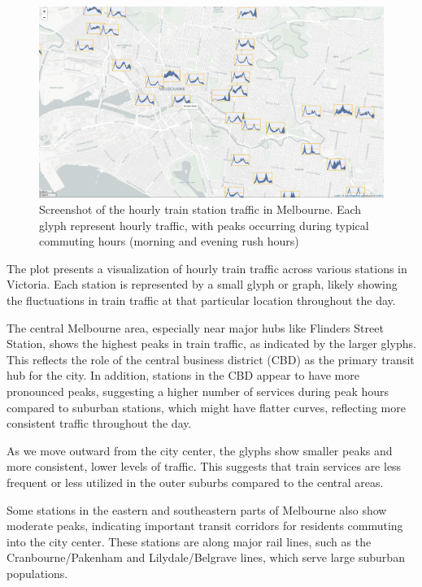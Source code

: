 \begin{figure}
\includegraphics[width=26.31in]{figures/leaflet} \caption{Screenshot of the hourly train station traffic in Melbourne. Each glyph represent hourly traffic, with peaks occurring during typical commuting hours (morning and evening rush hours)}\label{fig:unnamed-chunk-20}
\end{figure}

The plot presents a visualization of hourly train traffic across various stations in Victoria. Each station is represented by a small glyph or graph, likely showing the fluctuations in train traffic at that particular location throughout the day.

The central Melbourne area, especially near major hubs like Flinders Street Station, shows the highest peaks in train traffic, as indicated by the larger glyphs. This reflects the role of the central business district (CBD) as the primary transit hub for the city. In addition, stations in the CBD appear to have more pronounced peaks, suggesting a higher number of services during peak hours compared to suburban stations, which might have flatter curves, reflecting more consistent traffic throughout the day.

As we move outward from the city center, the glyphs show smaller peaks and more consistent, lower levels of traffic. This suggests that train services are less frequent or less utilized in the outer suburbs compared to the central areas.

Some stations in the eastern and southeastern parts of Melbourne also show moderate peaks, indicating important transit corridors for residents commuting into the city center. These stations are along major rail lines, such as the Cranbourne/Pakenham and Lilydale/Belgrave lines, which serve large suburban populations.


